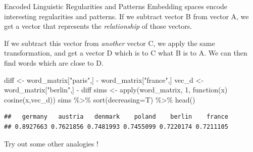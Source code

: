 \documentclass[
  10pt,
  ignorenonframetext,
  aspectratio=169]{beamer}
\newenvironment{Shaded}{\begin{snugshade}}{\end{snugshade}}
\newcommand{\AttributeTok}[1]{\textcolor[rgb]{0.80,0.80,0.80}{#1}}
\newcommand{\ControlFlowTok}[1]{\textcolor[rgb]{0.94,0.87,0.69}{#1}}
\newcommand{\DecValTok}[1]{\textcolor[rgb]{0.86,0.86,0.80}{#1}}
\newcommand{\FunctionTok}[1]{\textcolor[rgb]{0.94,0.94,0.56}{#1}}
\newcommand{\NormalTok}[1]{\textcolor[rgb]{0.80,0.80,0.80}{#1}}
\newcommand{\OtherTok}[1]{\textcolor[rgb]{0.94,0.94,0.56}{#1}}
\newcommand{\SpecialCharTok}[1]{\textcolor[rgb]{0.86,0.64,0.64}{#1}}
\newcommand{\StringTok}[1]{\textcolor[rgb]{0.80,0.58,0.58}{#1}}
\begin{document}
\begin{frame}[fragile]{Encoded Linguistic Regularities and Patterns}
\protect\hypertarget{encoded-linguistic-regularities-and-patterns}{}
Embedding spaces encode interesting regularities and patterns. If we
subtract vector B from vector A, we get a vector that represents the
\emph{relationship} of those vectors.

If we subtract this vector from \emph{another} vector C, we apply the
same transformation, and get a vector D which is to C what B is to A. We
can then find words which are close to D.

\medskip

\scriptsize

\begin{Shaded}
\begin{Highlighting}[]
\NormalTok{diff }\OtherTok{\textless{}{-}}\NormalTok{ word\_matrix[}\StringTok{"paris"}\NormalTok{,]  }\SpecialCharTok{{-}}\NormalTok{ word\_matrix[}\StringTok{"france"}\NormalTok{,] }
\NormalTok{vec\_d }\OtherTok{\textless{}{-}}\NormalTok{ word\_matrix[}\StringTok{"berlin"}\NormalTok{,] }\SpecialCharTok{{-}}\NormalTok{ diff}
\NormalTok{sims }\OtherTok{\textless{}{-}} \FunctionTok{apply}\NormalTok{(word\_matrix, }\DecValTok{1}\NormalTok{, }\ControlFlowTok{function}\NormalTok{(x) }\FunctionTok{cosine}\NormalTok{(x,vec\_d))}
\NormalTok{sims }\SpecialCharTok{\%\textgreater{}\%} \FunctionTok{sort}\NormalTok{(}\AttributeTok{decreasing=}\NormalTok{T) }\SpecialCharTok{\%\textgreater{}\%} \FunctionTok{head}\NormalTok{()}
\end{Highlighting}
\end{Shaded}

\begin{verbatim}
##   germany   austria   denmark    poland    berlin    france 
## 0.8927663 0.7621856 0.7481993 0.7455099 0.7220174 0.7211105
\end{verbatim}

\medskip
\normalsize

Try out some other analogies !
\end{frame}
\end{document}

